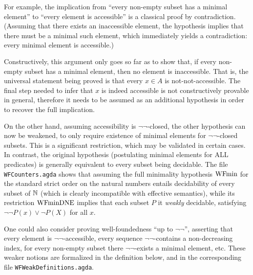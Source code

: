 For example, the implication from ``every non-empty subset has a minimal element'' to
``every element is accessible''  is a classical proof by contradiction.
(Assuming that there exists an inaccessible element, the hypothesis implies that
there must be a minimal such element, which immediately yields a contradiction:
every minimal element is accessible.)

Constructively, this argument only goes so far as to show that, if every non-empty
subset has a minimal element, then no element is inaccessible.
That is, the universal statement being proved is that every $x \in A$
is not-not-accessible. The final step needed to infer that $x$ is indeed accessible
is not constructively provable in general, therefore it needs to be assumed as
an additional hypothesis in order to recover the full implication.

On the other hand, assuming accessibility is $\lnot\lnot$-closed, the other
hypothesis can now be weakened, to only require existence of minimal elements
for $\lnot\lnot$-closed subsets.  This is a significant restriction, which may
be validated in certain cases.  In contrast, the original hypothesis
(postulating minimal elements for ALL predicates)
is generally equivalent to every subset being decidable.
The file \texttt{WFCounters.agda} shows that assuming the full minimality hypothesis $\mathrm{WFmin}$ for the standard strict order on the natural numbers entails decidability of every subset of $\mathbb{N}$ (which is clearly incompatible with effective semantics), while its restriction $\mathrm{WFminDNE}$ implies
that each subset $P$ it \emph{weakly} decidable,
satisfying $\lnot \lnot P(x) \lor \lnot P(X)$ for all $x$.

One could also consider proving well-foundedness ``up to $\lnot\lnot$'',
asserting that every element is $\lnot\lnot$-accessible,
every sequence $\lnot\lnot$-contains a non-decreasing index,
for every non-empty subset there $\lnot\lnot$-exists a minimal element, etc.
These weaker notions are formalized in the definition below, and in the corresponding file
\texttt{WFWeakDefinitions.agda}.

